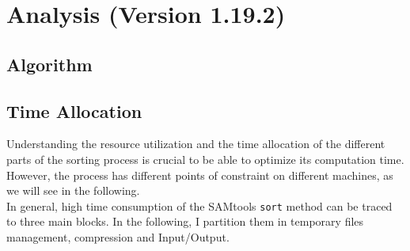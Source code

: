 \section{Analysis (Version 1.19.2)}

\subsection{Algorithm}

\FloatBarrier

\subsection{Time Allocation}
Understanding the resource utilization and the time allocation of the different parts of the sorting process is crucial to be able to optimize its computation time. However, the process has different points of constraint on different machines, as we will see in the following. \\
In general, high time consumption of the SAMtools \texttt{sort} method can be traced to three main blocks. In the following, I partition them in temporary files management, compression and Input/Output.



